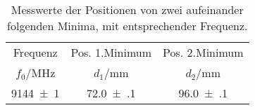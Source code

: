 \begin{table}[!h]
	\centering
	\begin{tabular}{ccc}
		\toprule
		Frequenz & Pos. 1.Minimum & Pos. 2.Minimum\\
		$f_0$/\si{MHz} & $d_1$/\si{mm} & $d_2$/\si{mm}\\
\midrule
		\num{9144(1)} & \num{72.0(1)} & \num{96.0(1)}\\
		\bottomrule
	\end{tabular}
	\caption{Messwerte der Positionen von zwei aufeinander folgenden Minima, 
	mit entsprechender Frequenz. 
                 \label{tab:Frequenzmessung}}
\end{table}
